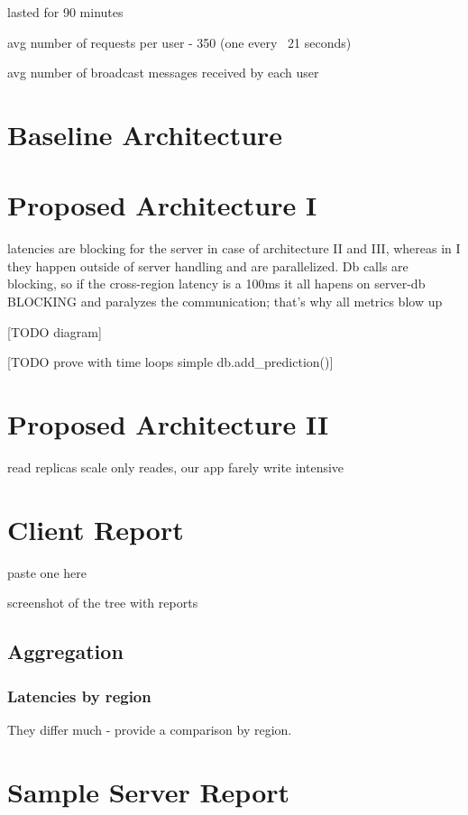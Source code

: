 \documentclass{uvamscse}
\begin{document}
lasted for 90 minutes

avg number of requests per user - 350 (one every ~21 seconds)

avg number of broadcast messages received by each user

\section{Baseline Architecture}

\section{Proposed Architecture I}
latencies are blocking for the server in case of architecture II and III, whereas in I they happen outside of server handling and are parallelized. Db calls are blocking, so if the cross-region latency is a 100ms it all hapens on server-db BLOCKING and paralyzes the communication; that's why all metrics blow up

[TODO diagram]

[TODO prove with time loops simple db.add\_prediction()]

\section{Proposed Architecture II}

read replicas scale only reades, our app farely write intensive

\section{Client Report}

paste one here

screenshot of the tree with reports

\subsection{Aggregation}

\subsubsection{Latencies by region}
They differ much - provide a comparison by region.

\section{Sample Server Report}
\end{document}
